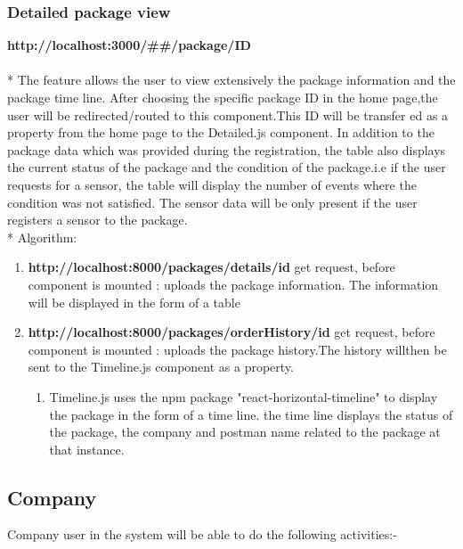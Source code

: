 \subsubsection{Detailed package view}
\textbf{http://localhost:3000/##/package/ID}\\
\\*
The feature allows the user to view extensively the package information and the package time line.
After choosing the specific package ID in the home page,the user will be redirected/routed to this component.This ID will be transfer ed as a property from the home page to the Detailed.js component. 
In addition to the package data which was provided during the registration, the table also displays the current status of the package and the condition of the package.i.e if the user requests for a sensor, the table will display the number of events where the condition was not satisfied.
The sensor data will be only present if the user registers a sensor to the package.\\*
Algorithm:
\begin{enumerate}
  \item \textbf{http://localhost:8000/packages/details/id}  get request, before component is mounted : uploads the package information. The information will be displayed in the form of a table
  \item \textbf{http://localhost:8000/packages/orderHistory/id}  get request, before component is mounted : uploads the package history.The history willthen be sent to the Timeline.js component as a property.
  \begin{enumerate}
      \item Timeline.js uses the npm package "react-horizontal-timeline" to display the package in the form of a time line.
      the time line displays the status of the package, the company and postman name related to the package at that instance.
    \end{enumerate}
\end{enumerate}


\subsection{Company}

Company user in the system will be able to do the following activities:-

